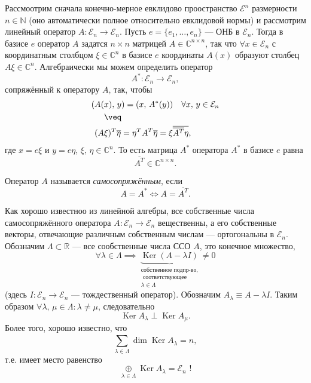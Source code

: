 \lec
Рассмоотрим сначала конечно-мерное евклидово проостранство $\mathcal{E}^n$ размерности $n \in \mathbb{N}$ 
(оно автоматически  полное относительно евклидовой нормы)
и рассмотрим линейный оператор $A : \mathcal{E}_n\to \mathcal{E}_n$.
Пусть $e=\{e_1,\ldots,e_n\} $ --- ОНБ в $\mathcal{E}_n$. Тогда в базисе $e$ оператор $A$ задатся $n \times n$ 
матрицей $A \in  \mathbb{C}^{n \times n}$, так что $\forall x \in  \mathcal{E}_n$
с координатным  столбцом $\xi \in  \mathbb{C}^n$ в базисе $e$ координаты $A(x)$ 
образуют столбец $A \xi \in  \mathbb{C}^n$.
Алгебраически мы можем определить оператор
\[
	A^* : \mathcal{E}_n \to  \mathcal{E}_n
 ,\]
 сопряжённый к оператору $A$, так, чтобы
 \begin{align*}
	 (A(&x),\,y)= (x,\, A^* (y)) \quad \forall x,\, y \in \mathcal{E}_n\\
	    & \veq\\
	 (A &\xi)^T \overline{\eta}= \eta^T A^T \overline{\eta} = \xi \overline{\overline{
	 A^T}\eta},
 \end{align*} 
 где $x= e \xi$ и $y = e \eta$, $\xi,\,\eta \in \mathbb{C}^n$.
 То есть матрица $A^*$ оператора  $A^*$ в базисе $e$ равна
 \[
	 \overline{A^T} \in  \mathbb{C}^{n \times n}
 .\] 
\begin{dfn}
Оператор $A$ называется \emph{самосопряжённым}, если
\[
A=A^* \Leftrightarrow A= \overline{A^T}
.\] 
\end{dfn} 
Как хорошо известноо из линейной алгебры, все собственные
числа самосопряжённого оператора $A: \mathcal{E}_n \to  \mathcal{E}_n$ вещественны, а его собственные векторы, отвечающие различным
собственным числам --- ортогональны в $\mathcal{E}_n$.
Обозначим $\Lambda \subset \mathbb{R}$ --- все сообственные
числа ССО $A$, это конечное множество,
\[
	\forall \lambda \in \Lambda \implies \underbrace{\operatorname{Ker}
(A- \lambda I)}_{\substack{\text{собственное
подпр-во,}\\ \text{ соответствующее}\\
\lambda \in \Lambda}} \neq 0
\] 
(здесь $I : \mathcal{E}_n \to \mathcal{E}_n$  --- тождественный
оператор). Обозначим $A_\lambda\equiv A- \lambda I$.
Таким образом $\forall \lambda,\,\mu \in \Lambda : \lambda \neq
 \mu$, следовательно
\[
	\operatorname{Ker} A_\lambda \perp \operatorname{Ker}
	A_\mu
.\] 
Более того, хорошо известно, что
\[
\sum_{\lambda \in \Lambda}^{} \dim  \operatorname{Ker}
A_\lambda = n,
\]
т.\:е. имеет место равенство
\[
	\underset{\lambda \in \Lambda}{\oplus} \operatorname{Ker}
	A_\lambda = \mathcal{E}_n \text{ !}
\] 
